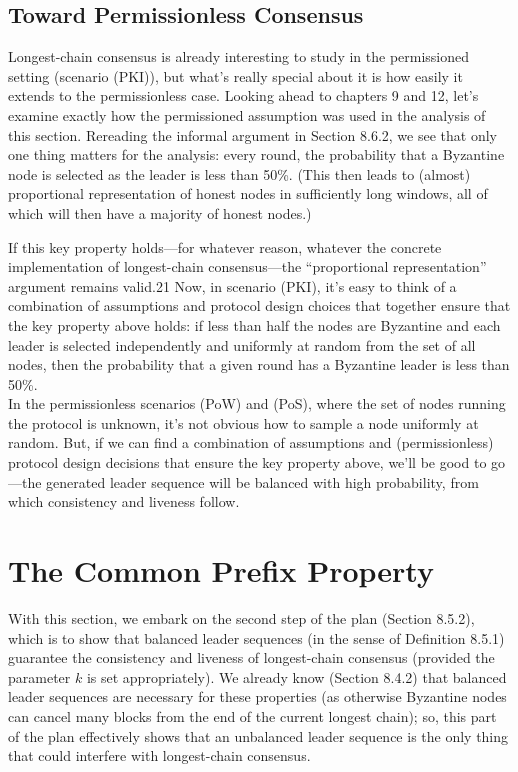 \subsection{Toward Permissionless Consensus}
Longest-chain consensus is already interesting to study in the permissioned setting (scenario (PKI)), but what’s really special about it is how easily it extends to the permissionless
case. Looking ahead to chapters 9 and 12, let’s examine exactly how the permissioned
assumption was used in the analysis of this section.
Rereading the informal argument in Section 8.6.2, we see that only one thing matters for
the analysis: every round, the probability that a Byzantine node is selected as the leader
is less than 50\%. (This then leads to (almost) proportional representation of honest nodes in
sufficiently long windows, all of which will then have a majority of honest nodes.)

If this key property holds—for whatever reason, whatever the concrete implementation of
longest-chain consensus—the “proportional representation” argument remains valid.21
Now, in scenario (PKI), it’s easy to think of a combination of assumptions and protocol
design choices that together ensure that the key property above holds: if less than half the
nodes are Byzantine and each leader is selected independently and uniformly at random from
the set of all nodes, then the probability that a given round has a Byzantine leader is less
than 50\%.\\
In the permissionless scenarios (PoW) and (PoS), where the set of nodes running the
protocol is unknown, it’s not obvious how to sample a node uniformly at random. But, if we can find a combination of assumptions and (permissionless) protocol design decisions that
ensure the key property above, we’ll be good to go—the generated leader sequence will be
balanced with high probability, from which consistency and liveness follow.

\section{The Common Prefix Property}
With this section, we embark on the second step of the plan (Section 8.5.2), which is to show
that balanced leader sequences (in the sense of Definition 8.5.1) guarantee the consistency
and liveness of longest-chain consensus (provided the parameter $k$ is set appropriately). We
already know (Section 8.4.2) that balanced leader sequences are necessary for these properties
(as otherwise Byzantine nodes can cancel many blocks from the end of the current longest
chain); so, this part of the plan effectively shows that an unbalanced leader sequence is the
only thing that could interfere with longest-chain consensus.
